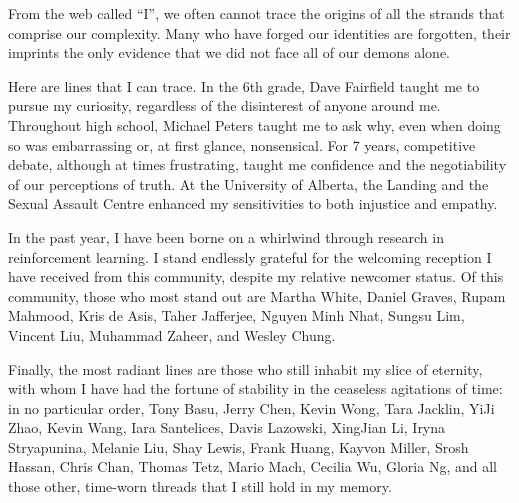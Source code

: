 \documentclass[\main/thesis.tex]{subfiles}
\begin{document}
\begin{acknowledgements} 


From the web called ``I'', we often cannot trace the origins of all the strands that comprise our complexity. Many who have forged our identities are forgotten, their imprints the only evidence that we did not face all of our demons alone. 

Here are lines that I can trace. In the 6th grade, Dave Fairfield taught me to pursue my curiosity, regardless of the disinterest of anyone around me. Throughout high school, Michael Peters taught me to ask why, even when doing so was embarrassing or, at first glance, nonsensical. For 7 years, competitive debate, although at times frustrating, taught me confidence and the negotiability of our perceptions of truth. At the University of Alberta, the Landing and the Sexual Assault Centre enhanced my sensitivities to both injustice and empathy. 

In the past year, I have been borne on a whirlwind through research in reinforcement learning. I stand endlessly grateful for the welcoming reception I have received from this community, despite my relative newcomer status. Of this community, those who most stand out are Martha White, Daniel Graves, Rupam Mahmood, Kris de Asis, Taher Jafferjee, Nguyen Minh Nhat, Sungsu Lim, Vincent Liu, Muhammad Zaheer, and Wesley Chung. 

Finally, the most radiant lines are those who still inhabit my slice of eternity, with whom I have had the fortune of stability in the ceaseless agitations of time: in no particular order, Tony Basu, Jerry Chen, Kevin Wong, Tara Jacklin, YiJi Zhao, Kevin Wang, Iara Santelices, Davis Lazowski, XingJian Li, Iryna Stryapunina, Melanie Liu, Shay Lewis, Frank Huang, Kayvon Miller, Srosh Hassan, Chris Chan, Thomas Tetz, Mario Mach, Cecilia Wu, Gloria Ng, and all those other, time-worn threads that I still hold in my memory. 

\end{acknowledgements}
\end{document}
